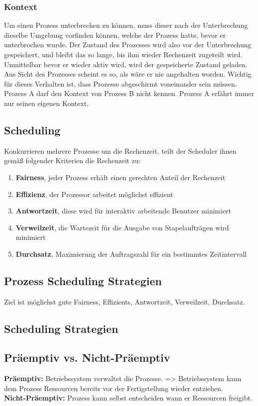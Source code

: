 \documentclass[12pt,a4paper]{article}
\begin{document}
	\subsubsection{Kontext}
	Um einen Prozess unterbrechen zu können, muss dieser nach der Unterbrechung dieselbe Umgebung vorfinden können, welche der Prozess hatte, bevor er unterbrochen wurde. Der Zustand des Prozesses wird also vor der Unterbrechung gespeichert, und bleibt das so lange, bis ihm wieder Rechenzeit zugeteilt wird. Unmittelbar bevor er wieder aktiv wird, wird der gespeicherte Zustand geladen. Aus Sicht des Prozesses scheint es so, als wäre er nie angehalten worden.\newline
	Wichtig für dieses Verhalten ist, dass Prozesse abgeschirmt voneinander sein müssen. Prozess A darf den Kontext von Prozess B nicht kennen. Prozess A erfährt immer nur seinen eigenen Kontext.
	
	\subsection{Scheduling}
	Konkurrieren mehrere Prozesse um die Rechenzeit, teilt der Scheduler ihnen gemäß folgender Kriterien die Rechenzeit zu:
	\begin{enumerate}
		\item \textbf{Fairness}, jeder Prozess erhält einen gerechten Anteil der Rechenzeit
		\item \textbf{Effizienz}, der Prozessor arbeitet möglichst effizient
		\item \textbf{Antwortzeit}, diese wird für interaktiv arbeitende Benutzer minimiert
		\item \textbf{Verweilzeit}, die Wartezeit für die Ausgabe von Stapelaufträgen wird minimiert
		\item \textbf{Durchsatz}, Maximierung der Auftragszahl für ein bestimmtes Zeitintervall
	\end{enumerate}
	
\subsection{Prozess Scheduling Strategien}
Ziel ist möglichst gute Fairness, Effizients, Antwortzeit, Verweilzeit, Durchsatz.

	\subsection{Scheduling Strategien} %
		\subsection*{Präemptiv vs. Nicht-Präemptiv}
			\textbf{Präemptiv:} Betriebssystem verwaltet die Prozesse. => Betriebssystem kann dem Prozess Ressourcen bereits vor der Fertigstellung wieder entziehen.\\
			\textbf{Nicht-Präemptiv:} Prozess kann selbst entscheiden wann er Ressourcen freigibt.
\end{document}
